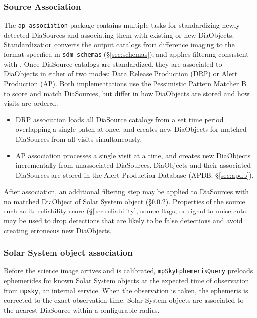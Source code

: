\subsubsection{Source Association}
\label{sec:association}

The \texttt{ap\_association} package contains multiple tasks for standardizing newly detected DiaSources and associating them with existing or new DiaObjects.
Standardization converts the output catalogs from difference imaging to the format specified in \texttt{sdm\_schemas} (\S\ref{sec:schemas}), and applies filtering consistent with \citep{DMTN-199}.
Once DiaSource catalogs are standardized, they are associated to DiaObjects in either of two modes: Data Release Production (DRP) or Alert Production (AP).
Both implementations use the Pessimistic Pattern Matcher B \citep{DMTN-031} to score and match DiaSources, but differ in how DiaObjects are stored and how visits are ordered.

\begin{itemize}
\item DRP association loads all DiaSource catalogs from a set time period overlapping a single patch at once, and creates new DiaObjects for matched DiaSources from all visits simultaneously.
\item AP association processes a single visit at a time, and creates new DiaObjects incrementally from unassociated DiaSources.
DiaObjects and their associated DiaSources are stored in the Alert Production Database (APDB; \S\ref{sec:apdb}).
\end{itemize}

After association, an additional filtering step may be applied to DiaSources with no matched DiaObject of Solar System object (\S\ref{sec:solar}).
Properties of the source such as its reliability score (\S\ref{sec:reliability}, source flags, or signal-to-noise cuts may be used to drop detections that are likely to be false detections and avoid creating erroneous new DiaObjects.

\subsubsection{Solar System object association}
\label{sec:solar}

Before the science image arrives and is calibrated, \texttt{mpSkyEphemerisQuery} preloads ephemerides for known Solar System objects at the expected time of observation from \texttt{mpsky}, an internal service.
When the observation is taken, the ephemeris is corrected to the exact observation time.
Solar System objects are associated to the nearest DiaSource within a configurable radius.

